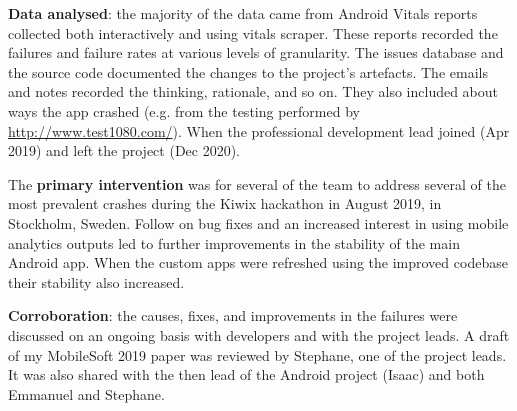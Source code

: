 \textbf{Data analysed}: the majority of the data came from Android Vitals reports collected both interactively and using vitals scraper. These reports recorded the failures and failure rates at various levels of granularity. The issues database and the source code documented the changes to the project's artefacts. The emails and notes recorded the thinking, rationale, and so on. They also included about ways the app crashed (e.g. from the testing performed by \url{http://www.test1080.com/}). When the professional development lead joined (Apr 2019) and left the project (Dec 2020).


The \textbf{primary intervention} was for several of the team to address several of the most prevalent crashes during the Kiwix hackathon in August 2019, in Stockholm, Sweden. Follow on bug fixes and an increased interest in using mobile analytics outputs led to further improvements in the stability of the main Android app. When the custom apps were refreshed using the improved codebase their stability also increased.

\textbf{Corroboration}: the causes, fixes, and improvements in the failures were discussed on an ongoing basis with developers and with the project leads. A draft of my MobileSoft 2019 paper was reviewed by Stephane, one of the project leads. It was also shared with the then lead of the Android project (Isaac) and both Emmanuel and Stephane. 




